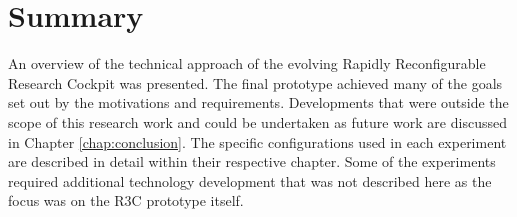 \section{Summary}

An overview of the technical approach of the evolving Rapidly Reconfigurable Research Cockpit was presented.
The final prototype achieved many of the goals set out by the motivations and requirements.
Developments that were outside the scope of this research work and could be undertaken as future work are discussed in Chapter \ref{chap:conclusion}.
The specific configurations used in each experiment are described in detail within their respective chapter.
Some of the experiments required additional technology development that was not described here as the focus was on the R3C prototype itself.
